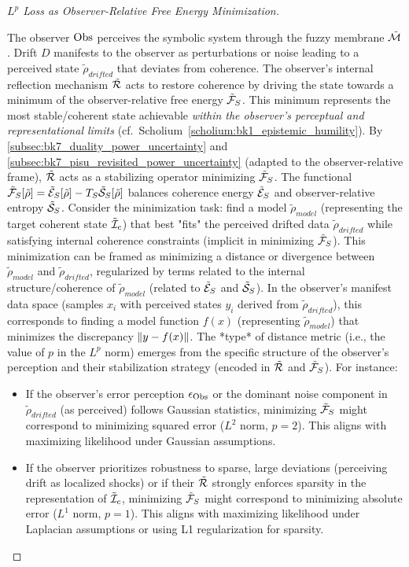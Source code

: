 \begin{proof}[$L^p$ Loss as Observer-Relative Free Energy Minimization]
\label{proof:bk7_sketch_lp_loss_as_observer_free_energy_minimization}
\leavevmode

The observer $\mathrm{Obs}$ perceives the symbolic system through the fuzzy membrane $\tilde{\mathcal{M}}$. Drift $D$ manifests to the observer as perturbations or noise leading to a perceived state $\tilde{\rho}_{drifted}$ that deviates from coherence. The observer's internal reflection mechanism $\tilde{\mathcal{R}}$ acts to restore coherence by driving the state towards a minimum of the observer-relative free energy $\tilde{\mathcal{F}}_S$. This minimum represents the most stable/coherent state achievable \emph{within the observer's perceptual and representational limits} (cf.~Scholium~\ref{scholium:bk1_epistemic_humility}).
By \ref{subsec:bk7_duality_power_uncertainty} and \ref{subsec:bk7_pisu_revisited_power_uncertainty} (adapted to the observer-relative frame), $\tilde{\mathcal{R}}$ acts as a stabilizing operator minimizing $\tilde{\mathcal{F}}_S$. The functional $\tilde{\mathcal{F}}_S[\tilde{\rho}] = \tilde{\mathcal{E}}_S[\tilde{\rho}] - T_S \tilde{\mathcal{S}}_S[\tilde{\rho}]$ balances coherence energy $\tilde{\mathcal{E}}_S$ and observer-relative entropy $\tilde{\mathcal{S}}_S$.
Consider the minimization task: find a model $\tilde{\rho}_{model}$ (representing the target coherent state $\tilde{\mathcal{I}}_c$) that best "fits" the perceived drifted data $\tilde{\rho}_{drifted}$ while satisfying internal coherence constraints (implicit in minimizing $\tilde{\mathcal{F}}_S$). This minimization can be framed as minimizing a distance or divergence between $\tilde{\rho}_{model}$ and $\tilde{\rho}_{drifted}$, regularized by terms related to the internal structure/coherence of $\tilde{\rho}_{model}$ (related to $\tilde{\mathcal{E}}_S$ and $\tilde{\mathcal{S}}_S$).
In the observer's manifest data space (samples $x_i$ with perceived states $y_i$ derived from $\tilde{\rho}_{drifted}$), this corresponds to finding a model function $f(x)$ (representing $\tilde{\rho}_{model}$) that minimizes the discrepancy $\left\|y - f(x)\right\|$. The *type* of distance metric (i.e., the value of $p$ in the $L^p$ norm) emerges from the specific structure of the observer's perception and their stabilization strategy (encoded in $\tilde{\mathcal{R}}$ and $\tilde{\mathcal{F}}_S$).
For instance:
\begin{itemize}
    \item If the observer's error perception $\epsilon_{\mathrm{Obs}}$ or the dominant noise component in $\tilde{\rho}_{drifted}$ (as perceived) follows Gaussian statistics, minimizing $\tilde{\mathcal{F}}_S$ might correspond to minimizing squared error ($L^2$ norm, $p=2$). This aligns with maximizing likelihood under Gaussian assumptions.
    \item If the observer prioritizes robustness to sparse, large deviations (perceiving drift as localized shocks) or if their $\tilde{\mathcal{R}}$ strongly enforces sparsity in the representation of $\tilde{\mathcal{I}}_c$, minimizing $\tilde{\mathcal{F}}_S$ might correspond to minimizing absolute error ($L^1$ norm, $p=1$). This aligns with maximizing likelihood under Laplacian assumptions or using L1 regularization for sparsity.

\end{itemize}
\end{proof}
